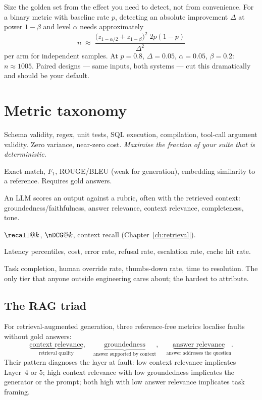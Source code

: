 \documentclass[11pt,twoside,openright]{book}
\theoremstyle{definition}
\theoremstyle{plain}
\theoremstyle{remark}
\begin{document}
\begin{keyidea}
Size the golden set from the effect you need to detect, not from convenience.
For a binary metric with baseline rate $p$, detecting an absolute improvement
$\Delta$ at power $1-\beta$ and level $\alpha$ needs approximately
\[
  n \;\approx\; \frac{\bigl(z_{1-\alpha/2}+z_{1-\beta}\bigr)^2\; 2p(1-p)}{\Delta^{2}}
\]
per arm for independent samples. At $p=0.8$, $\Delta=0.05$, $\alpha=0.05$,
$\beta=0.2$: $n \approx 1005$. Paired designs --- same inputs, both systems ---
cut this dramatically and should be your default.
\end{keyidea}

\section{Metric taxonomy}

\begin{description}[leftmargin=1.6em,style=nextline,itemsep=2pt]
  \item[Deterministic checks.] Schema validity, regex, unit tests, SQL execution,
        compilation, tool-call argument validity. Zero variance, near-zero cost.
        \emph{Maximise the fraction of your suite that is deterministic.}
  \item[Reference-based.] Exact match, $F_1$, ROUGE/BLEU (weak for generation),
        embedding similarity to a reference. Requires gold answers.
  \item[Reference-free judges.] An LLM scores an output against a rubric, often
        with the retrieved context: groundedness/faithfulness, answer relevance,
        context relevance, completeness, tone.
  \item[Retrieval metrics.] $\recall@k$, $\nDCG@k$, context recall
        (Chapter~\ref{ch:retrieval}).
  \item[Operational.] Latency percentiles, cost, error rate, refusal rate,
        escalation rate, cache hit rate.
  \item[Product.] Task completion, human override rate, thumbs-down rate, time to
        resolution. The only tier that anyone outside engineering cares about;
        the hardest to attribute.
\end{description}

\subsection{The RAG triad}

For retrieval-augmented generation, three reference-free metrics localise faults
without gold answers:
\[
  \underbrace{\text{context relevance}}_{\text{retrieval quality}},\quad
  \underbrace{\text{groundedness}}_{\text{answer supported by context}},\quad
  \underbrace{\text{answer relevance}}_{\text{answer addresses the question}} .
\]
Their pattern diagnoses the layer at fault: low context relevance implicates
Layer~4 or 5; high context relevance with low groundedness implicates the
generator or the prompt; both high with low answer relevance implicates task
framing.
\end{document}
